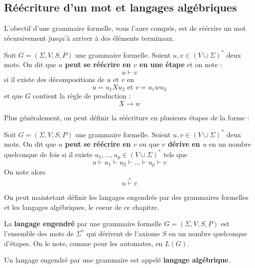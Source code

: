 \subsection{Réécriture d'un mot et langages algébriques}

L'obectif d'une grammaire formelle, vous l'aure compris, est de réécrire un mot récursivement jusqu'à arriver à des 
éléments terminaux. 

\begin{definition}
    Soit $ G = (\Sigma, V, S, P)$ une grammaire formelle. Soient $u,v \in \left( V \cup \Sigma \right)^*$ deux mots. 
    On dit que \textbf{$u$ peut se réécrire en $v$ en une étape} et on note :
        \[ u \vdash v \] 
    si il existe des décompositions de $u$ et $v$ en 
        \[ u = u_1 X u_2 \text{ et } v = u_1 w u_2 \] 
    et que $G$ contient la règle de production :
        \[ X \longrightarrow w \] 
\end{definition}

Plus généralement, on peut définir la réécriture en plusieurs étapes de la forme : 

\begin{definition}[Réécriture (2)]
    Soit $ G = (\Sigma, V, S, P)$ une grammaire formelle. Soient $u,v \in \left( V \cup \Sigma \right)^*$ deux mots.
    On dit que \textbf{$u$ peut se réécrire en $v$} ou que \textbf{$v$ dérive en $u$} en un nombre quelconque de fois si 
    il existe $u_1, \dots, u_p \in \left( V \cup \Sigma \right)^*$ tels que 
        \[ u \vdash u_1 \vdash u_2 \vdash \dots \vdash u_p \vdash v \] 
    On note alors 
        \[ u \overset{*}{\vdash} v \] 
\end{definition}

On peut maintetant définir les langages engendrés par des grammaires formelles et les langages algébriques, le coeur de ce 
chapitre. 

\begin{definition}
    La \textbf{langage engendré} par une grammaire formelle $ G = (\Sigma, V, S, P)$ est l'ensemble des mots de $\Sigma^*$ 
    qui dérivent de l'axiome $S$ en un nombre quelconque d'étapes. On le note, comme pour les automates, en $L(G)$. 
\end{definition}

\begin{definition}
    Un langage engendré par une grammaire est appelé \textbf{langage algébrique}. 
\end{definition}



